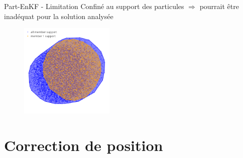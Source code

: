 \documentclass[aspectratio=169]{beamer} %
\begin{document}
\begin{frame}{Part-EnKF - Limitation}
    Confiné au support des particules $\Rightarrow$ pourrait être inadéquat pour la solution analysée
    \begin{figure}
        \centering
        \includegraphics[width=0.4\textwidth]{../../conference/images/ens_particles.pdf}
    \end{figure}
\end{frame}

\section{Correction de position}
\end{document}
